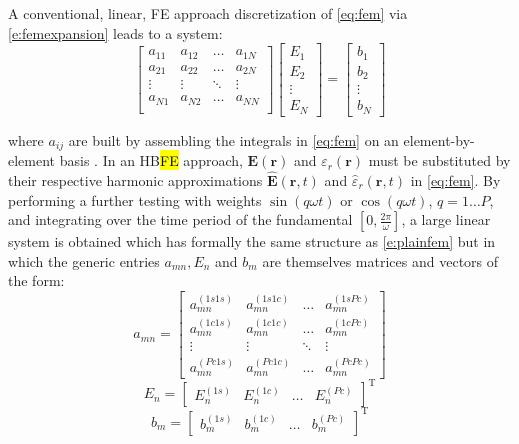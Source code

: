 \documentclass[journal]{IEEEtran}
\renewcommand{\vec}[1]{\mathbf{#1}}
\begin{document}
A conventional, linear, FE approach discretization of \eqref{eq:fem} via
\eqref{e:femexpansion} leads to a system:
%
\begin{equation}\label{e:plainfem}
\begin{bmatrix}
a_{11} & a_{12} & \ldots & a_{1N} \\
a_{21} & a_{22} & \ldots & a_{2N} \\
\vdots & \vdots & \ddots & \vdots \\
a_{N1} & a_{N2} & \ldots & a_{NN} \\
\end{bmatrix}
\begin{bmatrix}
E_1\\
E_2\\
\vdots\\
E_N
\end{bmatrix}
=
\begin{bmatrix}
b_1\\
b_2\\
\vdots\\
b_N
\end{bmatrix}
\end{equation}

\noindent where $a_{ij}$ are built by assembling the integrals in \eqref{eq:fem}
on an element-by-element basis \cite{Pelosi2009}. In an HB\hl{FE} approach, $\vec{E}(\vec{r})$ and
${\varepsilon}_r(\vec{r})$ must be substituted by their respective harmonic approximations $\vec{\hat{E}}(\vec{r}, t)$ and $\hat{{\varepsilon}}_r(\vec{r}, t)$ in \eqref{eq:fem}.  By performing
a further testing with weights $\sin(q \omega t)$ or
$\cos(q \omega t)$, $q = 1 \dots P$, and integrating over the time period of the fundamental $\left [
0,\frac{2\pi}{\omega} \right ]$,  a large linear system is
obtained which has formally the same structure as \eqref{e:plainfem} but in
which the generic entries $a_{mn}, E_n$ and $b_m$ are themselves matrices and vectors of the form:
%
\begin{equation}\label{e:HBfemmn}
a_{mn}=
\begin{bmatrix}
a_{mn}^{(1s1s)} & a_{mn}^{(1s1c)} & \ldots &  a_{mn}^{(1sPc)} \\
a_{mn}^{(1c1s)} & a_{mn}^{(1c1c)} & \ldots &  a_{mn}^{(1cPc)} \\
\vdots & \vdots & \ddots & \vdots \\
a_{mn}^{(Pc1s)} & a_{mn}^{(Pc1c)} & \ldots &  a_{mn}^{(PcPc)}
\end{bmatrix}
\end{equation}
\begin{equation} 
E_n = 
\begin{bmatrix}
E_{n}^{(1s)} &
E_{n}^{(1c)} &
\ldots &
E_{n}^{(Pc)}
\end{bmatrix}^\text{T}
\end{equation}
\begin{equation} 
b_m = 
\begin{bmatrix}
b_{m}^{(1s)} &
b_{m}^{(1c)} &
\ldots &
b_{m}^{(Pc)}
\end{bmatrix}^\text{T}
\end{equation}
\end{document}
